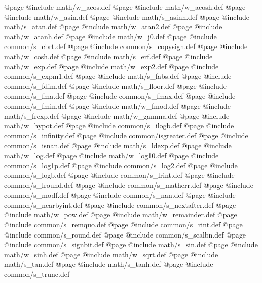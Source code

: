 @page @include   math/w_acos.def
@page @include   math/w_acosh.def
@page @include   math/w_asin.def
@page @include   math/s_asinh.def
@page @include   math/s_atan.def
@page @include   math/w_atan2.def
@page @include   math/w_atanh.def
@page @include   math/w_j0.def
@page @include common/s_cbrt.def
@page @include common/s_copysign.def
@page @include   math/w_cosh.def
@page @include   math/s_erf.def
@page @include   math/w_exp.def
@page @include   math/w_exp2.def
@page @include common/s_expm1.def
@page @include   math/s_fabs.def
@page @include common/s_fdim.def
@page @include   math/s_floor.def
@page @include common/s_fma.def
@page @include common/s_fmax.def
@page @include common/s_fmin.def
@page @include   math/w_fmod.def
@page @include   math/s_frexp.def
@page @include   math/w_gamma.def
@page @include   math/w_hypot.def
@page @include common/s_ilogb.def
@page @include common/s_infinity.def
@page @include   common/isgreater.def
@page @include common/s_isnan.def
@page @include   math/s_ldexp.def
@page @include   math/w_log.def
@page @include   math/w_log10.def
@page @include common/s_log1p.def
@page @include common/s_log2.def
@page @include common/s_logb.def
@page @include common/s_lrint.def
@page @include common/s_lround.def
@page @include common/s_matherr.def
@page @include common/s_modf.def
@page @include common/s_nan.def
@page @include common/s_nearbyint.def
@page @include common/s_nextafter.def
@page @include   math/w_pow.def
@page @include   math/w_remainder.def
@page @include common/s_remquo.def
@page @include common/s_rint.def
@page @include common/s_round.def
@page @include common/s_scalbn.def
@page @include common/s_signbit.def
@page @include   math/s_sin.def
@page @include   math/w_sinh.def
@page @include   math/w_sqrt.def
@page @include   math/s_tan.def
@page @include   math/s_tanh.def
@page @include common/s_trunc.def
